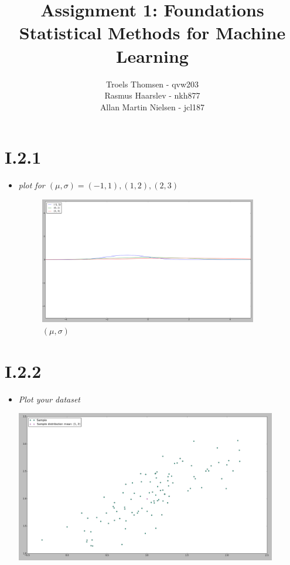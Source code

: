 \documentclass[12pt, a4paper]{article}
\title{Assignment 1: Foundations\\Statistical Methods for Machine Learning}
\author{Troels Thomsen - qvw203\\Rasmus Haarslev - nkh877\\Allan Martin Nielsen - jcl187}
\begin{document}
\pagestyle{empty}
\maketitle
\newpage

\pagestyle{fancy}

\section{I.2.1}
\begin{itemize}
\item \textit{plot for $(\mu, \sigma) = {(-1, 1), (1, 2), (2, 3)}$}

\begin{figure}[!h]
    \centering
    \includegraphics[width=0.9\textwidth]{1.png}
    \caption{$(\mu, \sigma)$}
    \label{fig:awesome_image}
\end{figure}
\end{itemize}
\section{I.2.2}
\begin{itemize}
\item \textit{Plot your dataset}

\includegraphics[width=0.9\textwidth]{2.png}

\end{itemize}
\end{document}
